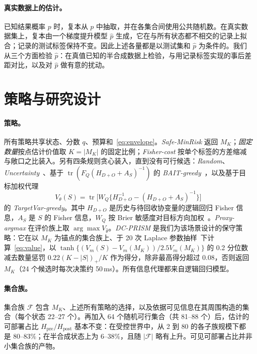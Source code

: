 \documentclass[runningheads]{llncs}
\newcommand{\Hpost}{H_{\mathrm{post}}}
\newcommand{\Hpre}{H_{\mathrm{pre}}}
\begin{document}
\paragraph{真实数据上的估计。}已知结果概率 $p$ 时，复本从 $p$ 中抽取，并在各集合间使用公共随机数。在真实数据集上，复本由一个梯度提升模型 $\hat p$ 生成，它在与所有状态都不相交的记录上拟合；记录的测试标签保持不变。因此上述各量都是以测试集和 $\hat p$ 为条件的。我们从三个方面检验 $\hat p$：在真值已知的半合成数据上检验，与用记录标签实现的事后差距对比，以及对 $\hat p$ 做有意的扰动。

\section{策略与研究设计}
\label{sec:policy}
\paragraph{策略。}所有策略共享状态、分数 $q$、预算和~\eqref{eq:envelope}。\emph{Safe-MinRisk} 返回 $M_K$；\emph{固定数量}按点估计价值取 $K=|M_K|$ 的固定比例；\emph{Fisher-cost} 按单个标签的方差缩减与敞口之比装入。另有四条规则贪心装入，直到没有可行候选：\emph{Random}、\emph{Uncertainty}~\cite{lewis1994sequential}、基于 $\operatorname{tr}(F_Q(H_{D+O}+A_S)^{-1})$ 的 \emph{BAIT-greedy}~\cite{ash2021fishing}，以及基于目标加权代理
\begin{equation}
 V_\theta(S)=\operatorname{tr}\big[W_Q\{H_{D+O}^{-1}-(H_{D+O}+A_S)^{-1}\}\big]\label{eq:value}
\end{equation}
的 \emph{TargetVar-greedy}。其中 $H_{D+O}$ 是历史与待回收协变量的逻辑回归 Fisher 信息，$A_S$ 是 $S$ 的 Fisher 信息，$W_Q$ 按 Brier 敏感度对目标方向加权~\cite{yu2006transductive,bickfordsmith2023prediction}。\emph{Proxy-argmax} 在评价族上取 $\arg\max V_{\hat\theta}$。\emph{DC-PRISM} 是我们为该场景设计的保守策略：它在以 $M_K$ 为锚点的集合族上、于 20 次 Laplace 参数抽样~\cite{mackay1992practical}下计算~\eqref{eq:value}，以 $\tanh\{(V_m(S)-V_m(M_K))/2.5V_m(M_K)\}$ 的 0.2 分位数减去数量惩罚 $0.22(K-|S|)_+/K$ 作为得分，除非最高得分超过 $0.08$，否则返回 $M_K$（24 个候选时每次决策约 50\,ms）。所有信息代理都来自逻辑回归模型。

\paragraph{集合族。}集合族 $\mathcal F$ 包含 $M_K$、上述所有策略的选择，以及依据可见信息在其周围构造的集合（每个状态 22--27 个）。再加入 64 个随机可行集合（共 81--88 个）后，估计的可部署占比 $\Hpre/\Hpost$ 基本不变：在受控世界中，从 2 到 80 的各子族规模下都是 80--83\%；在半合成状态上为 6--38\%，且随 $|\mathcal F|$ 略有上升。可见可部署占比并非小集合族的产物。
\end{document}
